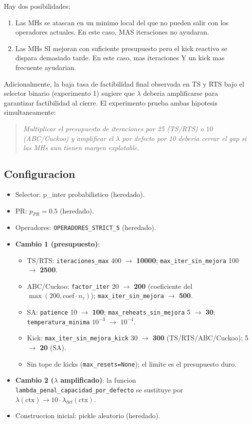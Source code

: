 Hay dos posibilidades:

\begin{enumerate}
\item Las MHs se atascan en un minimo local del que no pueden salir
  con los operadores actuales. En este caso, MAS iteraciones no
  ayudaran.
\item Las MHs SI mejoran con suficiente presupuesto pero el kick
  reactivo se dispara demasiado tarde. En este caso, mas iteraciones
  Y un kick mas frecuente ayudarian.
\end{enumerate}

Adicionalmente, la baja tasa de factibilidad final observada en TS y
RTS bajo el selector binario (experimento 1) sugiere que $\lambda$
deberia amplificarse para garantizar factibilidad al cierre. El
experimento prueba ambas hipotesis simultaneamente:

\begin{quote}
\textit{Multiplicar el presupuesto de iteraciones por 25 (TS/RTS) o
$10$ (ABC/Cuckoo) y amplificar el $\lambda$ por defecto por 10
deberia cerrar el gap si las MHs aun tienen margen explotable.}
\end{quote}

\subsection{Configuracion}

\begin{itemize}
\item Selector: p\_inter probabilistico (heredado).
\item PR: $p_{PR} = 0.5$ (heredado).
\item Operadores: \texttt{OPERADORES\_STRICT\_5} (heredado).
\item \textbf{Cambio 1 (presupuesto)}:
  \begin{itemize}
  \item TS/RTS: \texttt{iteraciones\_max} 400 $\to$ \textbf{10000};
    \texttt{max\_iter\_sin\_mejora} 100 $\to$ \textbf{2500}.
  \item ABC/Cuckoo: \texttt{factor\_iter} 20 $\to$ \textbf{200}
    (coeficiente del $\max(200, \text{coef} \cdot n_\tau)$);
    \texttt{max\_iter\_sin\_mejora} $\to$ \textbf{500}.
  \item SA: \texttt{patience} 10 $\to$ \textbf{100};
    \texttt{max\_reheats\_sin\_mejora} 5 $\to$ \textbf{30};
    \texttt{temperatura\_minima} $10^{-3}$ $\to$ \textbf{$10^{-4}$}.
  \item Kick: \texttt{max\_iter\_sin\_mejora\_kick} 30 $\to$
    \textbf{300} (TS/RTS/ABC/Cuckoo); 5 $\to$ \textbf{20} (SA).
  \item Sin tope de kicks (\texttt{max\_resets=None}); el limite es el
    presupuesto duro.
  \end{itemize}
\item \textbf{Cambio 2 ($\lambda$ amplificado)}: la funcion
  \texttt{lambda\_penal\_capacidad\_por\_defecto} se sustituye por
  $\lambda(\text{ctx}) \to 10 \cdot \lambda_{\text{def}}(\text{ctx})$.
\item Construccion inicial: pickle aleatorio (heredado).
\end{itemize}

